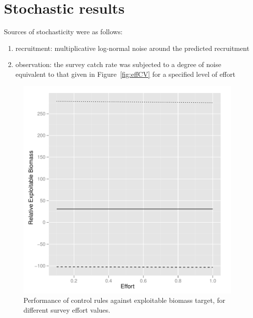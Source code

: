 \documentclass[a4paper]{article}
\begin{document}
\section{Stochastic results}

Sources of stochasticity were as follows:
\begin{enumerate}
\item recruitment: multiplicative log-normal noise around the predicted recruitment
\item observation: the survey catch rate was subjected to a degree of noise equivalent to that given in Figure~\ref{fig:effCV}
for a specified level of effort
\end{enumerate}






\begin{figure}
\centering
\includegraphics{script-023}
\caption{Performance of control rules against exploitable biomass target, for different survey effort values.}
\label{fig:hcr_stoch_biomass}
\end{figure}
\end{document}
